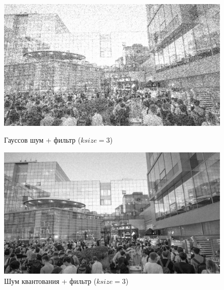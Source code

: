 \documentclass[a4paper]{article}
\begin{document}
\begin{figure}[H]
    \begin{minipage}{0.49\textwidth}
        \centering \includegraphics[width=\textwidth]{images/3_nonlinear_filters/gaussian - median (ksize=3).jpg}
        \caption{Гауссов шум + фильтр ($ksize = 3$)}
    \end{minipage}\hfill
    \begin{minipage}{0.49\textwidth}
        \centering \includegraphics[width=\textwidth]{images/3_nonlinear_filters/poisson - median (ksize=3).jpg}
        \caption{Шум квантования + фильтр ($ksize = 3$)}
    \end{minipage}
\end{figure}
\end{document}

